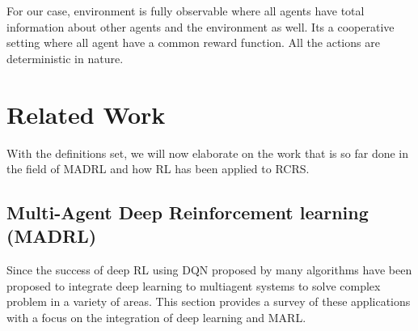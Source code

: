 \documentclass[12pt]{report}
\begin{document}
For our case, environment is fully observable where all agents have total information about other agents and the environment as well. Its a cooperative setting where all agent have a common reward function. All the actions are deterministic in nature. 

\chapter{Related Work}

With the definitions set, we will now elaborate on the work that is so far done in the field of MADRL and how RL has been applied to RCRS.

\section{Multi-Agent Deep Reinforcement learning (MADRL)}

Since the success of deep RL using DQN proposed by \cite{Kavukcuoglu} many algorithms have been proposed to integrate deep learning to multiagent systems to solve complex problem in a variety of areas. This section provides a survey of these applications with a focus on the integration of deep learning and MARL. 
\end{document}
